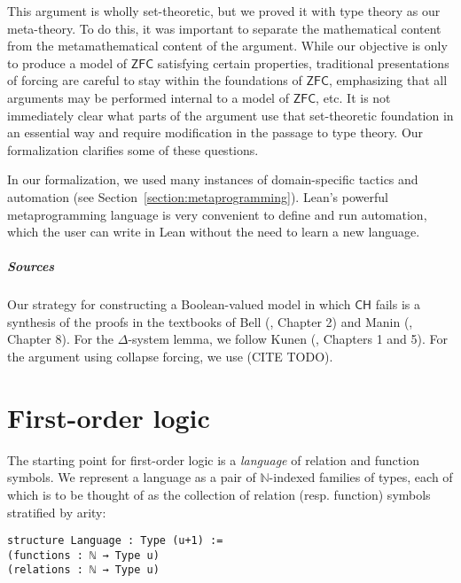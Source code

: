 \documentclass[sigplan,10pt,review, anonymous]{acmart}
\newcommand{\N}{\mathbb{N}}
\theoremstyle{definition}
\begin{document}
This argument is wholly set-theoretic, but we proved it with type theory as our meta-theory.
To do this, it was important to separate the mathematical content from the metamathematical content of the argument.
While our objective is only to produce a model of $\mathsf{ZFC}$ satisfying certain properties, traditional presentations of forcing are careful to stay within the foundations of $\mathsf{ZFC}$, emphasizing that all arguments may be performed internal to a model of $\mathsf{ZFC}$, etc.
It is not immediately clear what parts of the argument use that set-theoretic foundation in an essential way and require modification in the passage to type theory.
Our formalization clarifies some of these questions.

In our formalization, we used many instances of domain-specific tactics and automation (see Section~\ref{section:metaprogramming}).
Lean's powerful metaprogramming language is very convenient to define and run automation, which the user can write in Lean without the need to learn a new language.

\subparagraph*{Sources} Our strategy for constructing a Boolean-valued model in which $\mathsf{CH}$ fails is a synthesis of the proofs in the textbooks of Bell (\cite{bell2011set}, Chapter 2) and Manin (\cite{manin2009course}, Chapter 8). For the $\Delta$-system lemma, we follow Kunen (\cite{kunen2014set}, Chapters 1 and 5).
For the argument using collapse forcing, we use (CITE TODO).


\section{First-order logic}
\label{section:fol}

The starting point for first-order logic is a \emph{language} of relation and function symbols.
We represent a language as a pair of $\N$-indexed families of types, each of which is to be thought of as the collection of relation (resp. function) symbols stratified by arity:
\begin{lstlisting}
structure Language : Type (u+1) :=
(functions : ℕ → Type u)
(relations : ℕ → Type u)
\end{lstlisting}
\end{document}
